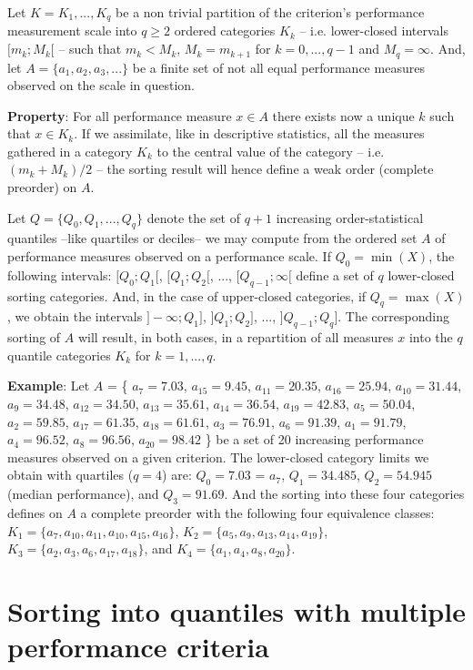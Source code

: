 Let $K = {K_1 , ..., K_q}$ be a non trivial partition of the criterion’s performance measurement scale into $q \geq 2$ ordered categories $K_k$ – i.e. lower-closed intervals $[m_k ; M_k[$ – such that $m_k < M_k$, $M_k = m_{k+1}$ for $k = 0, ..., q - 1$ and $M_q = \infty$. And, let $A=\{a_1 , a_2 , a_3 , ...\}$ be a finite set of not all equal performance measures observed on the scale in question.

\textbf{Property}: For all performance measure $x \in A$ there exists now a unique $k$ such that $x \in K_k$. If we assimilate, like in descriptive statistics, all the measures gathered in a category $K_k$ to the central value of the category – i.e. $(m_k + M_k)/2$ – the sorting result will hence define a weak order (complete preorder) on $A$.

Let $Q=\{Q_0 , Q_1 , ..., Q_q\}$ denote the set of $q + 1$ increasing order-statistical quantiles –like quartiles or deciles– we may compute from the ordered set $A$ of performance measures observed on a performance scale. If $Q_0 = \min(X)$, the following intervals: $[Q_0 ; Q_1 [$, $[Q_1 ; Q_2 [$, ..., $[Q_{q-1}; \infty[$ define a set of $q$ lower-closed sorting categories. And, in the case of upper-closed categories, if $Q_q = \max(X)$, we obtain the intervals $] -\infty; Q_1]$, $]Q_1 ; Q_2]$, ..., $]Q_{q-1} ; Q_q]$. The corresponding sorting of $A$ will result, in both cases, in a repartition of all measures $x$ into the $q$ quantile categories $K_k$ for $k = 1, ..., q$.

\textbf{Example}: Let $A$ = \{ $a_7 = 7.03$, $a_{15}=9.45$, $a_{11}= 20.35$, $a_{16}= 25.94$, $a_{10}= 31.44$, $a_9= 34.48$, $a_{12}= 34.50$, $a_{13}= 35.61$, $a_{14}= 36.54$, $a_{19}= 42.83$, $a_5= 50.04$, $a_2= 59.85$, $a_{17}= 61.35$, $a_{18}= 61.61$, $a_3= 76.91$, $a_6= 91.39$, $a_1= 91.79$, $a_4= 96.52$, $a_8= 96.56$, $a_{20}= 98.42$ \} be a set of 20 increasing performance measures observed on a given criterion. The lower-closed category limits we obtain with quartiles ($q = 4$) are: $Q_0 = 7.03$ = $a_7$, $Q_1= 34.485$, $Q_2= 54.945$ (median performance), and $Q_3= 91.69$. And the sorting into these four categories defines on $A$ a complete preorder with the following four equivalence classes: $K_1=\{a_7,a_{10},a_{11},a_{10},a_{15},a_{16}\}$, $K_2=\{a_5,a_9,a_{13},a_{14},a_{19}\}$, $K_3=\{a_2,a_3,a_6,a_{17},a_{18}\}$, and $K_4=\{a_1,a_4,a_8,a_{20}\}$.

\section{Sorting into quantiles with multiple performance criteria}
\label{sec:9.2}

